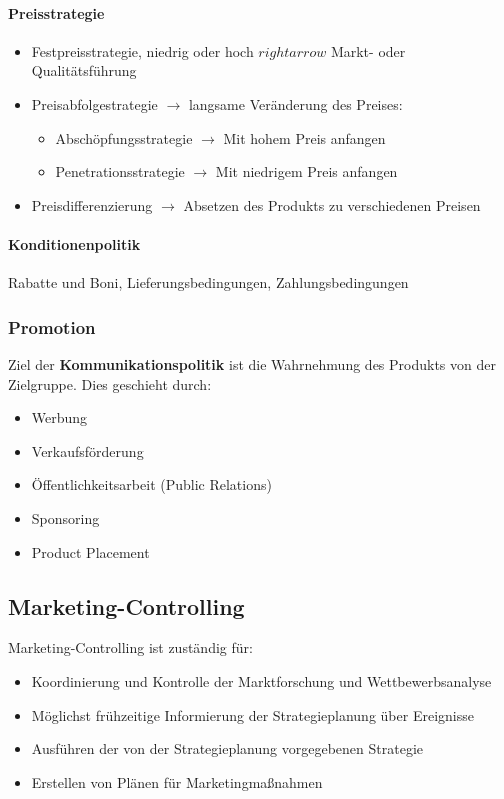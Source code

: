 \documentclass[titlepage,parskip=half]{scrartcl}
\begin{document}
\paragraph{Preisstrategie}
\begin{itemize}
    \item Festpreisstrategie, niedrig oder hoch $rightarrow$ Markt- oder Qualitätsführung
    \item Preisabfolgestrategie $\rightarrow$ langsame Veränderung des Preises:
    \begin{itemize}
        \item Abschöpfungsstrategie $\rightarrow$ Mit hohem Preis anfangen
        \item Penetrationsstrategie $\rightarrow$ Mit niedrigem Preis anfangen
    \end{itemize}
    \item Preisdifferenzierung $\rightarrow$ Absetzen des Produkts zu verschiedenen Preisen
\end{itemize}

\paragraph{Konditionenpolitik}
Rabatte und Boni, Lieferungsbedingungen, Zahlungsbedingungen


\subsubsection{Promotion}
Ziel der \textbf{Kommunikationspolitik} ist die Wahrnehmung des Produkts von der Zielgruppe. Dies geschieht durch:
\begin{itemize}
    \item Werbung
    \item Verkaufsförderung
    \item Öffentlichkeitsarbeit (Public Relations)
    \item Sponsoring
    \item Product Placement
\end{itemize}

\subsection{Marketing-Controlling}
Marketing-Controlling ist zuständig für:
\begin{itemize}
    \item Koordinierung und Kontrolle der Marktforschung und Wettbewerbsanalyse
    \item Möglichst frühzeitige Informierung der Strategieplanung über Ereignisse
    \item Ausführen der von der Strategieplanung vorgegebenen Strategie
    \item Erstellen von Plänen für Marketingmaßnahmen
\end{itemize}
\end{document}

